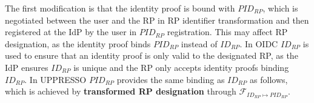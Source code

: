 The first modification is that the identity proof is bound with $PID_{RP}$,
    which is negotiated between the user and the RP in RP identifier transformation
     and then registered at the IdP by the user in $PID_{RP}$ registration.
This may affect RP designation, as the identity proof binds $PID_{RP}$ instead of $ID_{RP}$.
In OIDC $ID_{RP}$ is used to ensure that an identity proof is only valid to the designated RP,
 as the IdP ensures $ID_{RP}$ is unique and the RP only accepts identity proofs binding $ID_{RP}$.
In UPPRESSO $PID_{RP}$ provides the same binding as $ID_{RP}$ as follows,
 which is achieved by \textbf{transformed RP designation} through $\mathcal{F}_{ID_{RP} \mapsto PID_{RP}}$.
